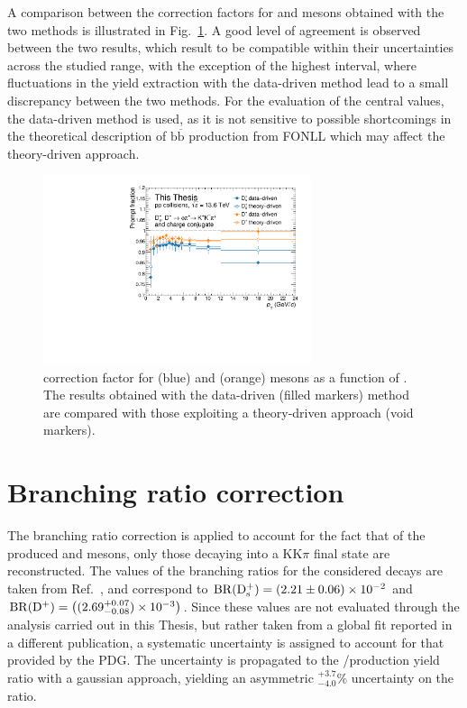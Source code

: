 A comparison between the \fp correction factors for \ds and \dpl mesons obtained with the two methods is illustrated in Fig.~\ref{fig:fp_comparison}. A good level of agreement is observed between the two results, which result to be compatible within their uncertainties across the studied \pt range, with the exception of the highest \pt interval, where fluctuations in the yield extraction with the data-driven method lead to a small discrepancy between the two methods. For the evaluation of the central \fp values, the data-driven method is used, as it is not sensitive to possible shortcomings in the theoretical description of $\mathrm{b\overline{b}}$ production from FONLL which may affect the theory-driven approach.

\begin{figure}
    \begin{center}
    \includegraphics[width=0.7\textwidth]{Figures/Chapter 6/Compare_data_theory_frac.pdf}
    \caption{\fp correction factor for \ds (blue) and \dpl (orange) mesons as a function of \pt. The results obtained with the data-driven (filled markers) method are compared with those exploiting a theory-driven approach (void markers).} 
    \label{fig:fp_comparison} 
    \end{center}
\end{figure}

\section{Branching ratio correction}
\begin{sloppypar}

The branching ratio correction is applied to account for the fact that of the produced \ds and \dpl mesons, only those decaying into a KK$\pi$ final state are reconstructed. The values of the branching ratios for the considered decays are taken from Ref.~\cite{pdg}, and correspond to \mbox{$\mathrm{BR}(\mathrm{D_s^+}) = (2.21\pm0.06)\times10^{-2}$} and \mbox{$\mathrm{BR}(\mathrm{D^+}) = \left((2.69^{+0.07}_{-0.08})\times10^{-3}\right)$}. Since these values are not evaluated through the analysis carried out in this Thesis, but rather taken from a global fit reported in a different publication, a systematic uncertainty is assigned to account for that provided by the PDG. The uncertainty is propagated to the \ds/\dpl production yield ratio with a gaussian approach, yielding an asymmetric $^{+3.7}_{-4.0}\%$ uncertainty on the ratio.
\end{sloppypar}

